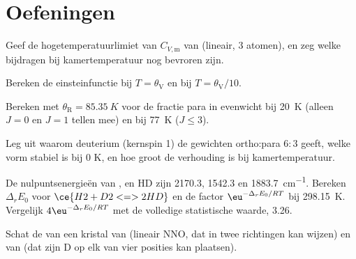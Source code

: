 \section{Oefeningen}

\begin{exercise}[$\star$]\label{exo:b3:statistical-thermo-applied:1}
Geef de hogetemperatuurlimiet van $C_{V,\mathrm m}$ van  (lineair, 3
atomen), en zeg welke bijdragen bij kamertemperatuur nog bevroren zijn.
\end{exercise}

\begin{exercise}[$\star$]\label{exo:b3:statistical-thermo-applied:2}
Bereken de einsteinfunctie bij $T = \theta_{\mathrm V}$ en bij $T = \theta_{\mathrm V}/10$.
\end{exercise}

\begin{exercise}[$\star$]\label{exo:b3:statistical-thermo-applied:3}
Bereken met $\theta_{\mathrm R} = \qty{85.35}{K}$ voor  de fractie para in
evenwicht bij
\qty{20}{K} (alleen $J = 0$ en $J = 1$ tellen mee) en bij \qty{77}{K} ($J \le 3$).
\end{exercise}

\begin{exercise}[$\star$]\label{exo:b3:statistical-thermo-applied:4}
Leg uit waarom deuterium (kernspin 1) de gewichten ortho:para $6 : 3$
geeft, welke vorm stabiel is bij 0 K, en hoe groot de verhouding is bij
kamertemperatuur.
\end{exercise}

\begin{exercise}[$\star\star$]\label{exo:b3:statistical-thermo-applied:5}
De nulpuntsenergieën van ,  en HD zijn 2170.3, 1542.3 en
\qty{1883.7}{cm^{-1}}. Bereken $\Delta_rE_0$ voor $\ce{H2 + D2 <=> 2 HD}$ en de factor $\eu^{-\Delta_rE_0/RT}$ bij
\qty{298.15}{K}. Vergelijk $4\eu^{-\Delta_rE_0/RT}$ met de volledige
statistische waarde, 3.26.
\end{exercise}

\begin{exercise}[$\star\star$]\label{exo:b3:statistical-thermo-applied:6}
Schat de  van een kristal van  (lineair NNO, dat in
twee richtingen kan wijzen) en van  (dat zijn D op elk van vier
posities kan plaatsen).
\end{exercise}

